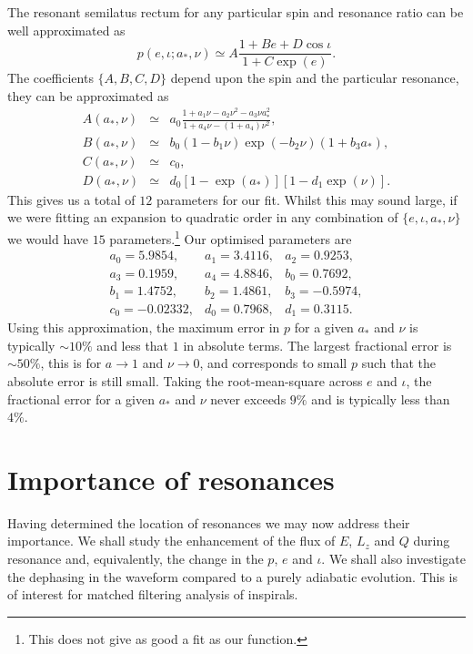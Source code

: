 \documentclass[aps,prd,amsfonts,amssymb,amsmath,nofootinbib,reprint,showpacs]{revtex4-1}
\begin{document}
The resonant semilatus rectum for any particular spin and resonance ratio can be well approximated as
\begin{equation}
p(e,\iota;a_\ast,\nu) \simeq A\frac{1 + B e + D \cos\iota}{1 + C\exp(e)}.
\end{equation}
The coefficients $\{A,B,C,D\}$ depend upon the spin and the particular resonance, they can be approximated as
\begin{eqnarray} 
A(a_\ast,\nu) & \simeq & a_0\frac{1 + a_1\nu - a_2 \nu^2 - a_3 \nu a_\ast^2}{1 + a_4\nu - (1 + a_4)\nu^2}, \\
B(a_\ast,\nu) & \simeq & b_0(1 - b_1\nu)\exp(-b_2\nu)(1 + b_3 a_\ast), \\
C(a_\ast,\nu) & \simeq & c_0, \\
D(a_\ast,\nu) & \simeq & d_0\left[1 - \exp(a_\ast)\right]\left[1 - d_1\exp(\nu)\right].
\end{eqnarray}
This gives us a total of $12$ parameters for our fit. Whilst this may sound large, if we were fitting an expansion to quadratic order in any combination of $\{e,\iota,a_\ast,\nu\}$ we would have $15$ parameters.\footnote{This does not give as good a fit as our function.} Our optimised parameters are
\begin{equation}
\begin{array}{lll}
a_0 = 5.9854, & a_1 = 3.4116, & a_2 = 0.9253,\\
a_3 = 0.1959, & a_4 = 4.8846, & b_0 = 0.7692,\\
b_1 = 1.4752, & b_2 = 1.4861, & b_3 = -0.5974,\\
c_0 = -0.02332, & d_0 = 0.7968, & d_1 = 0.3115.
\end{array}
\end{equation} 
Using this approximation, the maximum error in $p$ for a given $a_\ast$ and $\nu$ is typically $\sim10\%$ and less that $1$ in absolute terms. The largest fractional error is $\sim50\%$, this is for $a\rightarrow 1$ and $\nu \rightarrow 0$, and corresponds to small $p$ such that the absolute error is still small. Taking the root-mean-square across $e$ and $\iota$, the fractional error for a given $a_\ast$ and $\nu$ never exceeds $9\%$ and is typically less than $4\%$.

\section{Importance of resonances}

Having determined the location of resonances we may now address their importance. We shall study the enhancement of the flux of $E$, $L_z$ and $Q$ during resonance and, equivalently, the change in the $p$, $e$ and $\iota$. We shall also investigate the dephasing in the waveform compared to a purely adiabatic evolution. This is of interest for matched filtering analysis of inspirals.
\end{document}
